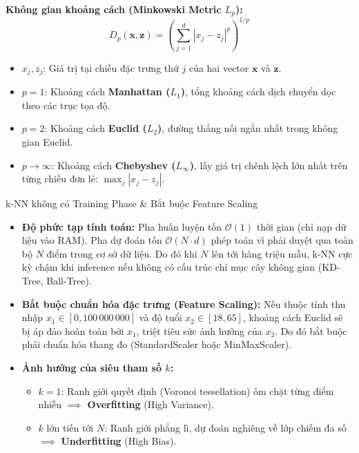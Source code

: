 \documentclass[10pt,a4paper]{article}
\begin{document}
\textbf{Không gian khoảng cách (Minkowski Metric $L_p$):}
\begin{equation}
    D_p(\mathbf{x}, \mathbf{z}) = \left( \sum_{j=1}^d |x_j - z_j|^p \right)^{1/p}
\end{equation}
\begin{itemize}[leftmargin=*]
    \item $x_j, z_j$: Giá trị tại chiều đặc trưng thứ $j$ của hai vector $\mathbf{x}$ và $\mathbf{z}$.
    \item $p=1$: Khoảng cách \textbf{Manhattan ($L_1$)}, tổng khoảng cách dịch chuyển dọc theo các trục tọa độ.
    \item $p=2$: Khoảng cách \textbf{Euclid ($L_2$)}, đường thẳng nối ngắn nhất trong không gian Euclid.
    \item $p \to \infty$: Khoảng cách \textbf{Chebyshev ($L_\infty$)}, lấy giá trị chênh lệch lớn nhất trên từng chiều đơn lẻ: $\max_j |x_j - z_j|$.
\end{itemize}

\begin{trapbox}{k-NN không có Training Phase \& Bắt buộc Feature Scaling}
\begin{itemize}[leftmargin=*]
    \item \textbf{Độ phức tạp tính toán:} Pha huấn luyện tốn $\mathcal{O}(1)$ thời gian (chỉ nạp dữ liệu vào RAM). Pha dự đoán tốn $\mathcal{O}(N \cdot d)$ phép toán vì phải duyệt qua toàn bộ $N$ điểm trong cơ sở dữ liệu. Do đó khi $N$ lên tới hàng triệu mẫu, k-NN cực kỳ chậm khi inference nếu không có cấu trúc chỉ mục cây không gian (KD-Tree, Ball-Tree).
    \item \textbf{Bắt buộc chuẩn hóa đặc trưng (Feature Scaling):} Nếu thuộc tính thu nhập $x_1 \in [0, 100\,000\,000]$ và độ tuổi $x_2 \in [18, 65]$, khoảng cách Euclid sẽ bị áp đảo hoàn toàn bởi $x_1$, triệt tiêu sức ảnh hưởng của $x_2$. Do đó bắt buộc phải chuẩn hóa thang đo (StandardScaler hoặc MinMaxScaler).
    \item \textbf{Ảnh hưởng của siêu tham số $k$:}
    \begin{itemize}
        \item $k=1$: Ranh giới quyết định (Voronoi tessellation) ôm chặt từng điểm nhiễu $\implies$ \textbf{Overfitting} (High Variance).
        \item $k$ lớn tiến tới $N$: Ranh giới phẳng lì, dự đoán nghiêng về lớp chiếm đa số $\implies$ \textbf{Underfitting} (High Bias).
    \end{itemize}
\end{itemize}
\end{trapbox}
\end{document}

